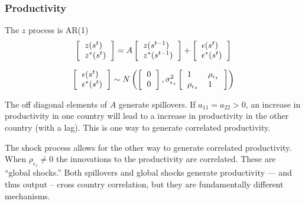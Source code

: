 \documentclass[11pt,pdftex,twoside,letterpaper]{exam}
\begin{document}
\subsubsection*{Productivity}
The $z$ process is AR(1)
\begin{equation}\label{eq:irbc-z-ar1}
 \left [ \begin{tabular}{l}
    $z(s^t)$\\
    $z^*(s^t)$
    \end{tabular}
    \right ] =
    A\left [ \begin{tabular}{l}
    $z(s^{t-1})$\\
    $z^*(s^{t-1})$
    \end{tabular}
    \right ]
    +
    \left [ \begin{tabular}{l}
    $\epsilon(s^{t})$\\
    $\epsilon^*(s^{t})$
    \end{tabular}
    \right ]
\end{equation}

\begin{equation}
 \left [ \begin{tabular}{l}
    $\epsilon(s^t)$\\
    $\epsilon^*(s^t)$
    \end{tabular}
    \right ] \sim
    N \left(
    \left[\begin{tabular}{l}
    $0$\\
    $0$
    \end{tabular}
    \right]
    ,\sigma^2_{\epsilon_z}
    \left[
    \begin{tabular}{ll}
    $1$&$\rho_{\epsilon_z}$\\
    $\rho_{\epsilon_z}$&$1$
    \end{tabular}
    \right]
    \right)
\end{equation}

The off diagonal elements of $A$ generate spillovers. If $a_{11}=a_{22}>0$, an increase in productivity in one country will lead to a increase in productivity in the other country (with a lag). This is one way to generate correlated productivity.

The shock process allows for the other way to generate correlated productivity. When $\rho_{\epsilon_z} \neq 0$ the innovations to the productivity are correlated. These are ``global shocks.'' Both spillovers and global shocks generate productivity --- and thus output -- cross country correlation, but they are fundamentally different mechanisms.
\end{document}
